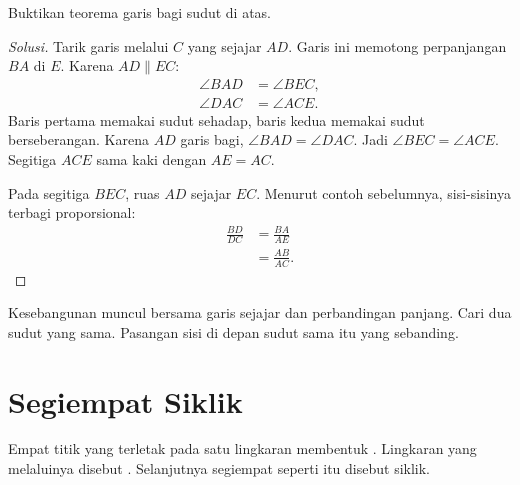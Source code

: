 \documentclass[12pt]{scrartcl}
\begin{document}
\begin{example}
Buktikan teorema garis bagi sudut di atas.
\begin{center}
\end{center}
\end{example}
\begin{proof}[Solusi]
Tarik garis melalui $C$ yang sejajar $AD$. Garis ini memotong perpanjangan
$BA$ di $E$. Karena $AD \parallel EC$:
\begin{align*}
\angle BAD &= \angle BEC, \\
\angle DAC &= \angle ACE.
\end{align*}
Baris pertama memakai sudut sehadap, baris kedua memakai sudut
berseberangan. Karena $AD$ garis bagi, $\angle BAD = \angle DAC$.
Jadi $\angle BEC = \angle ACE$. Segitiga $ACE$ sama kaki dengan
$AE = AC$.

Pada segitiga $BEC$, ruas $AD$ sejajar $EC$. Menurut contoh sebelumnya,
sisi-sisinya terbagi proporsional:
\begin{align*}
\frac{BD}{DC} &= \frac{BA}{AE} \\
&= \frac{AB}{AC}.
\end{align*}
\end{proof}

\begin{remark}
Kesebangunan muncul bersama garis sejajar dan perbandingan panjang. Cari
dua sudut yang sama. Pasangan sisi di depan sudut sama itu yang sebanding.
\end{remark}

\section{Segiempat Siklik}

Empat titik yang terletak pada satu lingkaran membentuk
. Lingkaran yang
melaluinya disebut . Selanjutnya
segiempat seperti itu disebut siklik.
\end{document}

